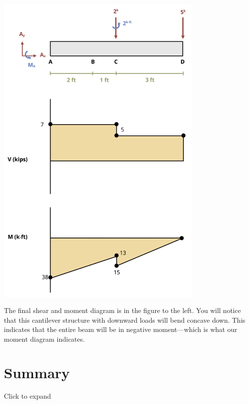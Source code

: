 \documentclass[
  letterpaper,
  DIV=11,
  numbers=noendperiod]{scrreprt}
\begin{document}
\begin{tcolorbox}
\begin{tcolorbox}
\begin{center}
\includegraphics[width=4.02083in,height=\textheight]{images/CH7 PNGs/example 7.4 part 7.png}
\end{center}

The final shear and moment diagram is in the figure to the left. You
will notice that this cantilever structure with downward loads will bend
concave down. This indicates that the entire beam will be in negative
moment---which is what our moment diagram indicates.

\end{tcolorbox}

\end{tcolorbox}

\section*{Summary}\label{summary-5}


Click to expand
\end{document}
